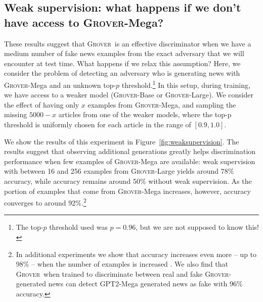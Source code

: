 \documentclass{article}
\newcommand{\modelname}{{\textsc{Grover}}}
\newcommand{\modelnamefordisc}{{\textsc{Grover}}}
\begin{document}
\subsection{Weak supervision: what happens if we don't have access to \modelname-Mega?}
These results suggest that \modelnamefordisc~is an effective discriminator when we have a medium number of fake news examples from the exact adversary that we will encounter at test time. What happens if we relax this assumption? Here, we consider the problem of detecting an adversary who is generating news with \modelname-Mega and an unknown top-$p$ threshold.\footnote{The top-$p$ threshold used was $p{=}0.96$, but we are not supposed to know this!} In this setup, during training, we have access to a weaker model (\modelname-Base or \modelname-Large). We consider the effect of having only $x$ examples from \modelname-Mega, and sampling the missing $5000{-}x$ articles from one of the weaker models, where the top-p threshold is uniformly chosen for each article in the range of $[0.9, 1.0]$. 

We show the results of this experiment in Figure~\ref{fig:weaksupervision}. The results suggest that observing additional generations greatly helps discrimination performance when few examples of \modelname-Mega are available: weak supervision with between 16 and 256 examples from \modelname-Large yields around 78\% accuracy, while accuracy remains around 50\% without weak supervision. As the portion of examples that come from \modelname-Mega increases, however, accuracy converges to around 92\%.\footnote{In additional experiments we show that accuracy increases even more -- up to 98\% -- when the number of examples is increased \citep{zellers2019blogpost}. We also find that \modelname~when trained to discriminate between real and fake \modelname-generated news can detect GPT2-Mega generated news as fake with 96\% accuracy.}

 
\end{document}
